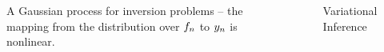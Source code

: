 \documentclass[final]{beamer}
\newlength{\sepwid}
\newlength{\onecolwid}
\newlength{\twocolwid}
\begin{document}
\begin{frame}[t]
\begin{columns}[t]
\begin{column}{\onecolwid}
\vspace{-1.5cm}
\begin{figure}

    
    \label{fig:gp}

    \caption{A Gaussian process for inversion problems -- the mapping from the
        distribution over $f_n$ to $y_n$ is nonlinear.}
\end{figure}



\end{column} %

\begin{column}{\sepwid}\end{column} %

\begin{column}{\twocolwid} %

\begin{columns}[t,totalwidth=\twocolwid] %

\begin{column}{\onecolwid}\vspace{-.6in} %



\begin{block}{Variational Inference}


\end{block}
\end{column}
\end{columns}
\end{column}
\end{columns}
\end{frame}
\end{document}
